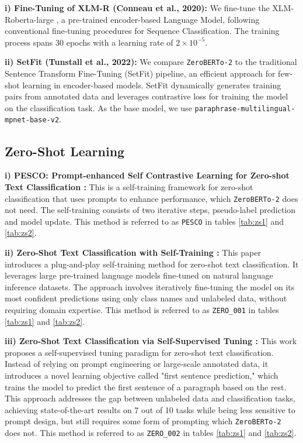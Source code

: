 \documentclass[]{politex-xico}
\begin{document}
\textbf{i) Fine-Tuning of XLM-R (Conneau et al.,
2020):}
We fine-tune the XLM-Roberta-large , a pre-trained encoder-based Language Model, following conventional fine-tuning procedures for Sequence Classification. The training process spans 30 epochs with a learning rate of $2 \times 10^{-5}$.

\textbf{ii) SetFit (Tunstall et al.,
2022):} We compare \texttt{ZeroBERTo-2} to the traditional Sentence
Transform Fine-Tuning (SetFit) pipeline, an efficient approach for few-shot
learning in encoder-based models. SetFit dynamically generates training pairs from
annotated data and leverages contrastive loss for training the model on the classification task. As the base model, we use \texttt{paraphrase-multilingual-mpnet-base-v2}.

\subsection{Zero-Shot Learning}

\textbf{i) PESCO: Prompt-enhanced Self Contrastive Learning for Zero-shot Text Classification \cite{wang2023pesco}:}
This is a self-training framework for zero-shot classification that uses prompts to enhance performance, which \texttt{ZeroBERTo-2} does not need. The self-training consists of two iterative steps, pseudo-label prediction and model update. This method is referred to as \texttt{PESCO} in tables \ref{tab:zs1} and \ref{tab:zs2}. 


\textbf{ii) Zero-Shot Text Classification with Self-Training \cite{gera2022zero}:}
This paper introduces a plug-and-play self-training method for zero-shot text classification. It leverages large pre-trained language models fine-tuned on natural language inference datasets. The approach involves iteratively fine-tuning the model on its most confident predictions using only class names and unlabeled data, without requiring domain expertise. This method is referred to as \texttt{ZERO\_001} in tables \ref{tab:zs1} and \ref{tab:zs2}. 

\textbf{iii) Zero-Shot Text Classification via Self-Supervised Tuning \cite{liu2023zero}:}
This work proposes a self-supervised tuning paradigm for zero-shot text classification. Instead of relying on prompt engineering or large-scale annotated data, it introduces a novel learning objective called "first sentence prediction," which trains the model to predict the first sentence of a paragraph based on the rest. This approach addresses the gap between unlabeled data and classification tasks, achieving state-of-the-art results on 7 out of 10 tasks while being less sensitive to prompt design, but still requires some form of prompting which \texttt{ZeroBERTo-2} does not. This method is referred to as \texttt{ZERO\_002} in tables \ref{tab:zs1} and \ref{tab:zs2}. 
\end{document}
